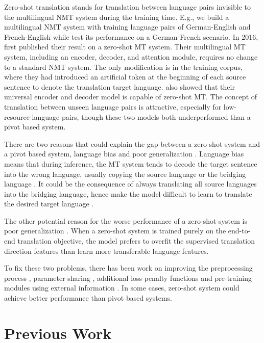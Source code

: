 \documentclass[thesis,fonts=libertine]{cluu}
\begin{document}
Zero-shot translation stands for translation between language pairs invisible to the multilingual NMT system during the training time. E.g., we build a multilingual NMT system with training language pairs of German-English and French-English while test its performance on a German-French scenario. In 2016, \cite{Johnson:2016aa} first published their result on a zero-shot MT system. Their multilingual MT system, including an encoder, decoder, and attention module, requires no change to a standard NMT system. The only modification is in the training corpus, where they had introduced an artificial token at the beginning of each source sentence to denote the translation target language. \cite{Ha:2016aa} also showed that their universal encoder and decoder model is capable of zero-shot MT. The concept of translation between unseen language pairs is attractive, especially for low-resource language pairs, though these two models both underperformed than a pivot based system.

There are two reasons that could explain the gap between a zero-shot system and a pivot based system, language bias \parencite{Ha:2016aa, Ha:2017aa, Arivazhagan:2019aa} and poor generalization \parencite{Arivazhagan:2019aa}. Language bias means that during inference, the MT system tends to decode the target sentence into the wrong language, usually copying the source language or the bridging language \cite{Ha:2016aa}. It could be the consequence of always translating all source languages into the bridging language, hence make the model difficult to learn to translate the desired target language \parencite{Arivazhagan:2019aa}.

The other potential reason for the worse performance of a zero-shot system is poor generalization \parencite{Arivazhagan:2019aa}. When a zero-shot system is trained purely on the end-to-end translation objective, the model prefers to overfit the supervised translation direction features than learn more transferable language features.

To fix these two problems, there has been work on improving the preprocessing process \parencite{Lakew:2018aa}, parameter sharing \parencite{Firat:2016aa, Blackwood:2018aa}, additional loss penalty functions \parencite{Arivazhagan:2019aa} and pre-training modules using external information \parencite{Baziotis:2020aa}. In some cases, zero-shot system could achieve better performance than pivot based systems.

\section{Previous Work}
\label{sec:previous_work}
\end{document}
